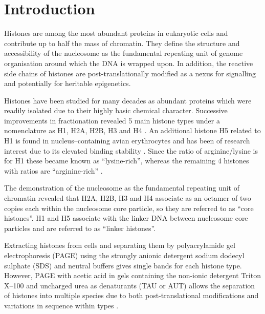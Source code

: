 \section{Introduction}

  Histones are among the most abundant proteins in eukaryotic cells and contribute up
  to half the mass of chromatin. They define the structure and accessibility of the
  nucleosome as the fundamental repeating unit of genome organisation around which
  the DNA is wrapped upon. In addition, the reactive
  side chains of histones are post-translationally modified as a nexus for signalling
  and potentially for heritable epigenetics.

  Histones have been studied for many decades as abundant proteins which were readily
  isolated due to their highly basic chemical character. Successive improvements in
  fractionation revealed 5 main histone types under a nomenclature as H1, H2A, H2B, H3
  and H4 \citep{nomenclature}. An additional histone H5 related to H1 is found in
  nucleus--containing avian erythrocytes and has been of research interest due to its
  elevated binding stability \citep{HFive-review}.
  Since the ratio of arginine/lysine is \LinkerArgLysRatio{}
  for H1 these became known as ``lysine-rich'', whereas the remaining 4 histones with
  ratios \CoreArgLysRatio{} are ``arginine-rich'' .

  The demonstration of the nucleosome as the fundamental repeating unit of chromatin revealed
  that H2A, H2B, H3 and H4 associate as an octamer of two copies each within the
  nucleosome core particle, so they are referred to as ``core histones''. H1 and H5
  associate with the linker DNA between nucleosome core particles and are referred to
  as ``linker histones''.

  Extracting histones from cells and separating them by polyacrylamide gel electrophoresis
  (PAGE) using the strongly anionic detergent sodium dodecyl sulphate (SDS) and neutral
  buffers gives single bands for each histone type. However, PAGE with acetic acid in gels
  containing the non-ionic detergent Triton X--100 and uncharged urea as denaturants
  (TAU or AUT) allows the separation of histones into multiple species due to both
  post-translational modifications and variations in sequence within types \citep{PAGEND}.

